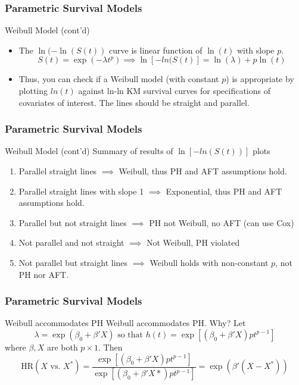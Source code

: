 \documentclass{beamer}
\theoremstyle{definition}
\begin{document}
\begin{frame}
\frametitle{Parametric Survival Models}
\begin{block}{Weibull Model (cont'd)}
\begin{itemize}
\item The $\ln(-\ln(S(t))$ curve is linear function of $\ln(t)$ with slope $p$.
\[ S(t)  = \exp(-\lambda t^p) \implies \ln[-ln(S(t)] = \ln(\lambda) + p \ln(t)
\]
\item Thus, you can check if a Weibull model (with constant $p$) is appropriate by plotting $ln(t)$ against ln-ln KM survival curves for specifications of covariates of interest. The lines should be straight and parallel.

\end{itemize}
\end{block}
\end{frame}


\begin{frame}
\frametitle{Parametric Survival Models}
\begin{block}{Weibull Model (cont'd)}
Summary of results of $\ln[-ln(S(t))]$ plots
\begin{enumerate}
\item Parallel straight lines $\implies$ Weibull, thus PH and AFT assumptions hold.
\item Parallel straight lines with slope 1 $\implies$ Exponential, thus PH and AFT assumptions hold.
\item Parallel but not straight lines $\implies$ PH not Weibull, no AFT (can use Cox)
\item Not parallel and not straight $\implies$ Not Weibull, PH violated
\item Not parallel but straight lines $\implies$ Weibull holds with non-constant $p$, not PH nor AFT.
\end{enumerate}
\end{block}
\end{frame}

\begin{frame}
\frametitle{Parametric Survival Models}
\begin{block}{Weibull accommodates PH}
Weibull accommodates PH. Why? Let
\[
\lambda=\exp(\beta_0 + \beta' X) \text{ so that }  h(t) = \exp[(\beta_0 + \beta' X) p t^{p-1}]
\] where $\beta, X$ are both $p \times 1$.
Then
\[
\text{HR}(X \text{ vs. } X^*)  = \dfrac{ \exp[(\beta_0 + \beta' X) p t^{p-1}]}{ \exp[(\beta_0 + \beta' X*) p t^{p-1}]} = \exp(\beta'(X - X^*))
\]
\end{block}
\end{frame}
\end{document}
